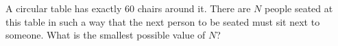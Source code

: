 A circular table has exactly $60$ chairs around it. There are $N$ people seated at this table in such a way that the next person to be seated must sit next to someone. What is the smallest possible value of $N$?
